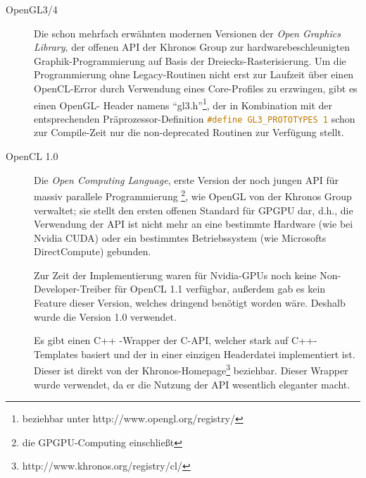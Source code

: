 	\begin{description}
		\item[OpenGL3/4]
		Die schon mehrfach erwähnten modernen Versionen der \linebreak \emph{Open Graphics Library},
		der offenen API der Khronos Group zur \linebreak hardwarebeschleunigten Graphik-Programmierung 
		auf Basis der Dreiecks-Rasterisierung.
		Um die Programmierung ohne Legacy-Routinen nicht erst zur Laufzeit über einen OpenCL-Error
		durch Verwendung eines Core-Profiles zu erzwingen, gibt es einen OpenGL- Header
		namens "`gl3.h"'\footnote{beziehbar unter http://www.opengl.org/registry/},
		der in Kombination mit der entsprechenden Präprozessor-Definition
		\lstinline[language=C]|#define GL3_PROTOTYPES 1| schon zur Compile-Zeit nur die non-deprecated
		Routinen zur Verfügung stellt.
		
     	\item[OpenCL 1.0]
	    Die \emph{Open Computing Language}, erste Version der noch jungen API für massiv parallele Programmierung
	    \footnote{die GPGPU-Computing einschließt}, wie OpenGL von der Khronos Group verwaltet; 
	    sie stellt den ersten offenen Standard für GPGPU dar, d.h., die Verwendung der API ist nicht mehr an eine
	    bestimmte Hardware (wie bei Nvidia CUDA) oder ein bestimmtes Betriebssystem (wie Microsofts DirectCompute)
	    gebunden.
	    
	    Zur Zeit der Implementierung waren für Nvidia-GPUs noch keine Non-Developer-Treiber für OpenCL 1.1 verfügbar, 
	    außerdem gab es kein Feature dieser Version, welches dringend benötigt worden wäre.
	    Deshalb wurde die Version 1.0 verwendet.
	    
	    Es gibt einen C++ -Wrapper der C-API, welcher stark auf C++-Templates basiert und der in einer einzigen Headerdatei 
	    implementiert ist. Dieser ist direkt von der Khronos-Homepage\footnote{http://www.khronos.org/registry/cl/} 	
	    beziehbar. Dieser Wrapper wurde verwendet, da er die Nutzung der API wesentlich eleganter macht.
	    

\end{description}
